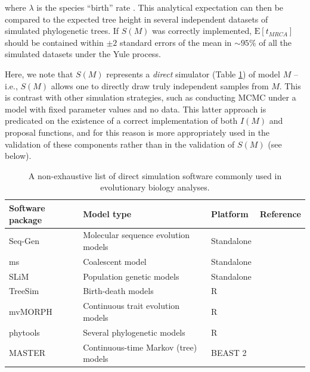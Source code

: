 \documentclass[oneside]{article}
\begin{document}
\noindent where $\lambda$ is the species ``birth'' rate \citep{yule24}.
This analytical expectation can then be compared to the expected tree
height in several independent datasets of simulated phylogenetic trees.
If $S(M)$ was correctly implemented, $\text{E}[t_{MRCA}]$ should be contained within $\pm 2$ standard errors of
the mean in $\sim 95\%$ of all the simulated datasets under the Yule process.

Here, we note that $S(M)$ represents a \emph{direct} simulator (Table
\ref{tab:sim}) of model
$M$ -- i.e., $S(M)$ allows one to directly draw truly independent
samples from $M$.
This is contrast with other simulation strategies, such as conducting
MCMC under a model with fixed parameter values and no data.
This latter approach is predicated on the existence of a correct
implementation of both $I(M)$ and proposal functions, and for this
reason is more appropriately used in the validation of these components rather than in
the validation of $S(M)$ (see below).

\begin{center}
  \begin{table}
  \caption{A non-exhaustive list of direct simulation software commonly used in evolutionary
    biology analyses.}
  \label{tab:sim}
  \begin{tabular}{ p{0.7in} | p{1.3in} | p{1in} | p{1.1in} }
    \hline
    Software package & Model type & Platform & Reference \\
    \hline  
    Seq-Gen & Molecular sequence evolution models & Standalone & \citealp{rambaut97} \\
    ms & Coalescent model & Standalone & \citealp{hudson02}\\
    SLiM & Population genetic models & Standalone & \citealp{haller19}\\
    TreeSim & Birth-death models & R & \citealp{stadler11}\\
    mvMORPH & Continuous trait evolution models & R &
                                                      \citealp{clavel15}\\
    phytools & Several phylogenetic models & R & \citealp{revell12}\\
    MASTER & Continuous-time Markov (tree) models & BEAST 2 & \citealp{vaughan13}\\
    \hline
  \end{tabular}
  \end{table}
\end{center}
\end{document}
